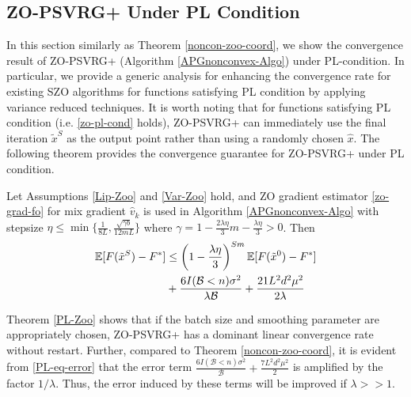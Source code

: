 \subsection{ZO-PSVRG+ Under PL Condition}
In this section similarly as Theorem \ref{noncon-zoo-coord}, we show the convergence result of ZO-PSVRG+ (Algorithm \ref{APGnonconvex-Algo}) under PL-condition. In particular, we provide a generic analysis for enhancing the convergence rate for existing SZO algorithms for functions satisfying PL condition by applying variance reduced techniques. It is worth noting that for functions satisfying PL condition (i.e. \eqref{zo-pl-cond} holds), ZO-PSVRG+ can immediately use the final iteration $\tilde{x}^S$
as the output point rather than using a randomly chosen
$\hat{x}$. 
The following theorem provides the convergence guarantee for ZO-PSVRG+ under PL condition.

\begin{theorem}\label{PL-Zoo}
Let Assumptions \ref{Lip-Zoo} and \ref{Var-Zoo} hold, and  ZO gradient estimator \eqref{zo-grad-fo} for mix gradient $\hat{v}_k$ is  used  in  Algorithm \ref{APGnonconvex-Algo} with stepsize $\eta \leq \min\{\frac{1}{8L}, \frac{\sqrt{\gamma b}}{12 m L }\}$ where $\gamma = 1-\frac{2\lambda\eta}{3} m-\frac{\lambda\eta}{3} > 0$. Then 
\begin{align}
\E[F(\tilde{x}^S) - {F}^*] & \leq   \left(1-\frac{\lambda\eta}{3}\right)^{Sm} \E[F(\tilde{x}^0) - {F}^*]\notag\\
& + \frac{6I(\mathcal{B} < n) \sigma ^2}{\lambda \mathcal{B}}+\frac{21 L^2 d^2 \mu^2}{2\lambda}\label{PL-eq-error}
\end{align}
\end{theorem}
Theorem \ref{PL-Zoo} shows that if the batch size and smoothing parameter are  appropriately chosen, ZO-PSVRG+ has a dominant linear convergence rate without restart. Further, compared to Theorem \ref{noncon-zoo-coord}, it is evident from \eqref{PL-eq-error} that the  error term $\frac{6I(\mathcal{B} < n) \sigma ^2}{\mathcal{B}}+\frac{7L^2 d^2 \mu^2}{2}$ is amplified by the factor $1/\lambda$. Thus, the error induced by these terms will be improved if $\lambda >> 1$.

